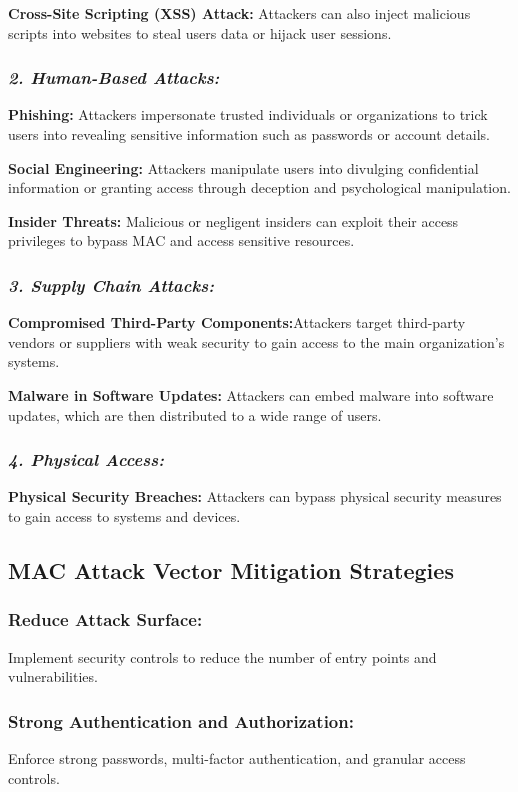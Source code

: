 \textbf{Cross-Site Scripting (XSS) Attack:}
Attackers can also inject malicious scripts into websites to steal users data or hijack user sessions.

\subsubsection{\textit{2. Human-Based Attacks:}}
\textbf{Phishing:}
Attackers impersonate trusted individuals or organizations to trick users into revealing sensitive information such as passwords or account details. 

\textbf{Social Engineering:}
Attackers manipulate users into divulging confidential information or granting access through deception and psychological manipulation. 

\textbf{Insider Threats:}
Malicious or negligent insiders can exploit their access privileges to bypass MAC and access sensitive resources. 

\subsubsection{\textit{3. Supply Chain Attacks:}}
\textbf{Compromised Third-Party Components:}Attackers target third-party vendors or suppliers with weak security to gain access to the main organization's systems. 

\textbf{Malware in Software Updates:}
Attackers can embed malware into software updates, which are then distributed to a wide range of users. 

\subsubsection{\textit{4. Physical Access:}}
\textbf{Physical Security Breaches:}
Attackers can bypass physical security measures to gain access to systems and devices. 

\subsection{MAC Attack Vector Mitigation Strategies}

\subsubsection{\textbf{Reduce Attack Surface:}}
Implement security controls to reduce the number of entry points and vulnerabilities. 

\subsubsection{\textbf{Strong Authentication and Authorization:}}
Enforce strong passwords, multi-factor authentication, and granular access controls. 

